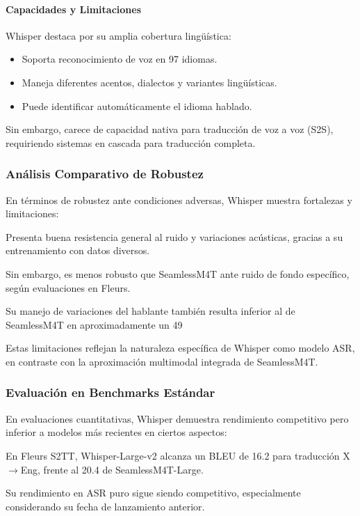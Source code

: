 \paragraph{Capacidades y Limitaciones}
Whisper destaca por su amplia cobertura lingüística:

\begin{itemize}
    \item Soporta reconocimiento de voz en 97 idiomas.
    \item Maneja diferentes acentos, dialectos y variantes lingüísticas.
    \item Puede identificar automáticamente el idioma hablado.
\end{itemize}

Sin embargo, carece de capacidad nativa para traducción de voz a voz (S2S), requiriendo sistemas en cascada para traducción completa.

\subsubsection{Análisis Comparativo de Robustez}
En términos de robustez ante condiciones adversas, Whisper muestra fortalezas y limitaciones:

Presenta buena resistencia general al ruido y variaciones acústicas, gracias a su entrenamiento con datos diversos.

Sin embargo, es menos robusto que SeamlessM4T ante ruido de fondo específico, según evaluaciones en Fleurs.

Su manejo de variaciones del hablante también resulta inferior al de SeamlessM4T en aproximadamente un 49%

Estas limitaciones reflejan la naturaleza específica de Whisper como modelo ASR, en contraste con la aproximación multimodal integrada de SeamlessM4T.

\subsubsection{Evaluación en Benchmarks Estándar}
En evaluaciones cuantitativas, Whisper demuestra rendimiento competitivo pero inferior a modelos más recientes en ciertos aspectos:

En Fleurs S2TT, Whisper-Large-v2 alcanza un BLEU de 16.2 para traducción X$\rightarrow$Eng, frente al 20.4 de SeamlessM4T-Large.

Su rendimiento en ASR puro sigue siendo competitivo, especialmente considerando su fecha de lanzamiento anterior.

